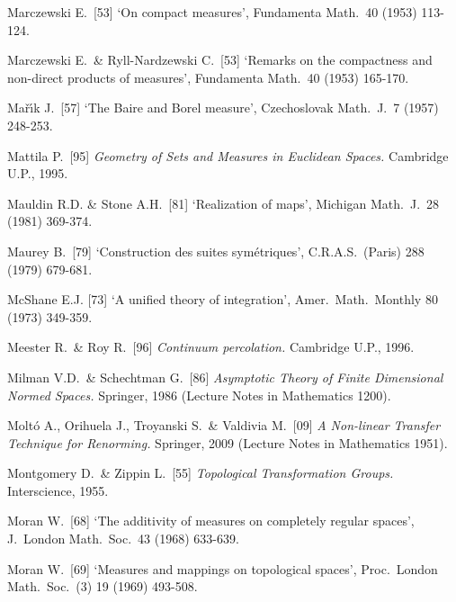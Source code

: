 {Marczewski E.\ [53] `On compact measures', Fundamenta Math.\ 40 (1953)
113-124.

Marczewski E.\ \& Ryll-Nardzewski C.\ [53] `Remarks on the compactness
and non-direct products of measures', Fundamenta Math.\ 40 (1953)
165-170.
\cmmnt{[454C.]}

Ma\v{r}\'{\i}k J.\ [57] `The Baire and Borel measure', Czechoslovak
Math.\ J.\ 7 (1957) 248-253.
\cmmnt{[435C.]}

Mattila P.\ [95] {\it Geometry of Sets and Measures in Euclidean
Spaces.}   Cambridge U.P., 1995.

Mauldin R.D. \& Stone A.H.\ [81] `Realization of maps', Michigan Math.\
J.\ 28 (1981) 369-374.
\cmmnt{[418T.]}

Maurey B.\ [79] `Construction des suites sym\'etriques', C.R.A.S.\ (Paris) 288 (1979) 679-681.
\cmmnt{[492H.]}

McShane E.J. [73] `A unified theory of integration', Amer.\ Math.\
Monthly 80 (1973) 349-359.
\cmmnt{[481M.]}

Meester R.\ \& Roy R.\ [96] {\it Continuum percolation.}  Cambridge
U.P., 1996.
\cmmnt{[\S495 {\it notes\/}.]}

Milman V.D.\ \& Schechtman G.\ [86]
{\it Asymptotic Theory of Finite Dimensional Normed Spaces.}
Springer, 1986 (Lecture Notes in Mathematics 1200).
\cmmnt{[492G, \S492 {\it notes\/}.]}


Molt\'o A., Orihuela J., Troyanski S.\ \& Valdivia M.\ [09] {\it A
Non-linear Transfer Technique for Renorming.}   Springer, 2009 (Lecture
Notes in Mathematics 1951).
\cmmnt{[\S467 {\it notes.}]}

Montgomery D.\ \& Zippin L.\ [55] {\it Topological Transformation
Groups.}   Interscience, 1955.
\cmmnt{[\S446 {\it notes.}]}

Moran W.\ [68] `The additivity of measures on completely regular
spaces', J.\ London Math.\ Soc.\ 43 (1968) 633-639.
\cmmnt{[439P.]}

Moran W.\ [69] `Measures and mappings on topological spaces', Proc.\
London Math.\ Soc.\ (3) 19 (1969) 493-508.
\cmmnt{[435Xk.]}

}
